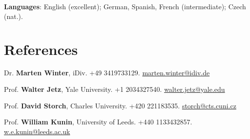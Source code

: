 \medskip

{\bf Languages}: English (excellent); German, Spanish, French (intermediate); Czech (nat.).

\HRule

\section{References}

Dr. \textbf{Marten Winter}, iDiv. \phone +49 3419733129. \href{mailto: marten.winter@idiv.de}{marten.winter@idiv.de}

\medskip

Prof. \textbf{Walter Jetz}, Yale University. \phone +1 2034327540. \href{mailto:walter.jetz@yale.edu}{walter.jetz@yale.edu}

\medskip

Prof. \textbf{David Storch}, Charles University. \phone +420 221183535. 
\href{mailto:storch@cts.cuni.cz}{storch@cts.cuni.cz}

\medskip

Prof. \textbf{William Kunin}, University of Leeds. \phone +440 1133432857. \href{mailto:w.e.kunin@leeds.ac.uk}{w.e.kunin@leeds.ac.uk}






\grid
\grid
